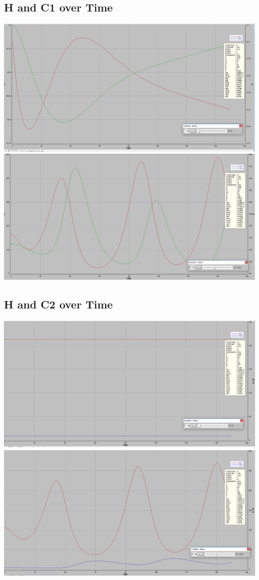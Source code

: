 \documentclass [12pt] {article}
\begin{document}
\subsection{H and C1 over Time}
\includegraphics[scale=0.3]{graph2a.png} \\
\includegraphics[scale=0.3]{graph2b.png}

\subsection{H and C2 over Time}
\includegraphics[scale=0.3]{graph3a.png} \\
\includegraphics[scale=0.3]{graph3b.png}
\end{document}
